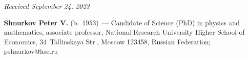 \vspace*{-14pt}

\hfill{\small\textit{Received September 24, 2023}} 

\vspace*{-26pt}

\Contrl

\vspace*{-6pt}


\noindent
\textbf{Shnurkov Peter V.} (b.\ 1953)~--- 
Candidate of Science (PhD) in physics and mathematics, associate professor,
 National Research University Higher School of Economics, 34~Tallinskaya Str., Moscow 123458, Russian Federation; \mbox{pshnurkov@hse.ru}


\label{end\stat}

\renewcommand{\bibname}{\protect\rm Литература} 